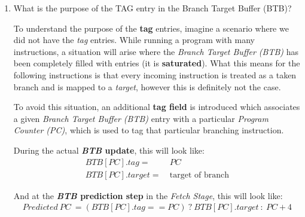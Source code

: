 \documentclass[12pt]{article}
\newenvironment{QandA}{\begin{enumerate}[label=\bfseries\arabic*.]\bfseries}
                      {\end{enumerate}}
\newenvironment{answered}{\par\quad\normalfont}{}
\begin{document}
\begin{QandA}
\begin{answered}
We select lower order 7-bits instead of higher order 7-bits because the lower order bits change a lot more than the higher order bits during a program. This can also be thought of as picking bits that have the highest \textit{entropy} and therefore can store the largest amount of information.

\textit{Is this the best way to do this hashing?} No, there are definitely better and more complicated ways to design a hashing function that better utilizes it's has indices. But this is a good start. 
\end{answered}

\ 

\item What is the purpose of the TAG entry in the Branch Target Buffer (BTB)?
\begin{answered}
To understand the purpose of the \textbf{tag} entries, imagine a scenario where we did not have the \textit{tag} entries. While running a program with many instructions, a situation will arise where the \textit{Branch Target Buffer (BTB)} has been completely filled with entries (it is \textbf{saturated}). What this means for the following instructions is that every incoming instruction is treated as a taken branch and is mapped to a \textit{target}, however this is definitely not the case.

To avoid this situation, an additional \textbf{tag field} is introduced which associates a given \textit{Branch Target Buffer (BTB)} entry with a particular \textit{Program Counter (PC)}, which is used to tag that particular branching instruction. 

During the actual \textbf{\textit{BTB} update}, this will look like:
\begin{equation*}
\begin{split}
    BTB[PC].tag = & \ PC \\
    BTB[PC].target = & \ \text{target of branch} 
\end{split}
\end{equation*}

And at the \textbf{\textit{BTB} prediction step} in the \textit{Fetch Stage}, this will look like:
\begin{equation*}
    \begin{split}
        Predicted\ PC\ = (BTB[PC].tag == PC)\ ?\ BTB[PC].target\ :\ PC + 4
    \end{split}
\end{equation*}
\end{answered}
\vspace{-0.8cm}


\end{QandA}
\end{document}

